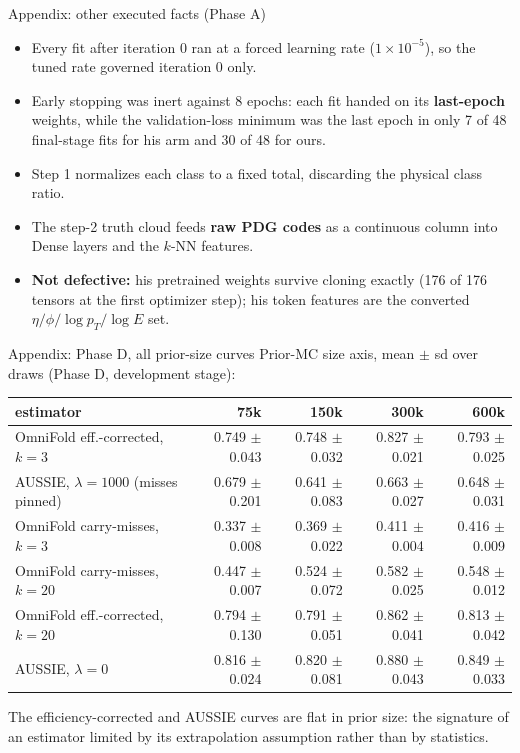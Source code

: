 \documentclass[aspectratio=169,10pt]{beamer}
\def\evidencetext{}
\begin{document}
\gdef\evidencetext{\texttt{phase\_a/receipts/historical\_receipts.json}; \texttt{phase\_a/receipts/runtime\_audit\_theirs.json}}
\begin{frame}{Appendix: other executed facts (Phase A)}
\begin{itemize}\small
\item Every fit after iteration 0 ran at a forced learning rate (\ensuremath{1\times10^{-5}}), so the tuned rate governed iteration 0 only.
\item Early stopping was inert against 8 epochs: each fit handed on its \textbf{last-epoch} weights, while the
validation-loss minimum was the last epoch in only 7 of 48 final-stage fits for his arm and 30 of 48 for ours.
\item Step 1 normalizes each class to a fixed total, discarding the physical class ratio.
\item The step-2 truth cloud feeds \textbf{raw PDG codes} as a continuous column into Dense layers and the $k$-NN features.
\item \textbf{Not defective:} his pretrained weights survive cloning exactly (176 of 176 tensors at the first
optimizer step); his token features are the converted $\eta/\phi/\log p_T/\log E$ set.
\end{itemize}
\end{frame}

\gdef\evidencetext{\texttt{phase\_d/results/scalar\_scaling.json}}
\begin{frame}{Appendix: Phase D, all prior-size curves}
{\small Prior-MC size axis, mean $\pm$ sd over draws (Phase D, development stage):}
\begin{center}
{\scriptsize
\begin{tabular}{lrrrr}
\toprule
estimator & 75k & 150k & 300k & 600k \\
\midrule
OmniFold eff.-corrected, $k=3$ & 0.749 $\pm$ 0.043 & 0.748 $\pm$ 0.032 & 0.827 $\pm$ 0.021 & 0.793 $\pm$ 0.025 \\
AUSSIE, $\lambda=1000$ (misses pinned) & 0.679 $\pm$ 0.201 & 0.641 $\pm$ 0.083 & 0.663 $\pm$ 0.027 & 0.648 $\pm$ 0.031 \\
OmniFold carry-misses, $k=3$ & 0.337 $\pm$ 0.008 & 0.369 $\pm$ 0.022 & 0.411 $\pm$ 0.004 & 0.416 $\pm$ 0.009 \\
OmniFold carry-misses, $k=20$ & 0.447 $\pm$ 0.007 & 0.524 $\pm$ 0.072 & 0.582 $\pm$ 0.025 & 0.548 $\pm$ 0.012 \\
OmniFold eff.-corrected, $k=20$ & 0.794 $\pm$ 0.130 & 0.791 $\pm$ 0.051 & 0.862 $\pm$ 0.041 & 0.813 $\pm$ 0.042 \\
AUSSIE, $\lambda=0$ & 0.816 $\pm$ 0.024 & 0.820 $\pm$ 0.081 & 0.880 $\pm$ 0.043 & 0.849 $\pm$ 0.033 \\
\bottomrule
\end{tabular}}
\end{center}
{\small The efficiency-corrected and AUSSIE curves are flat in prior size: the signature of an estimator limited
by its extrapolation assumption rather than by statistics.}
\end{frame}
\end{document}
